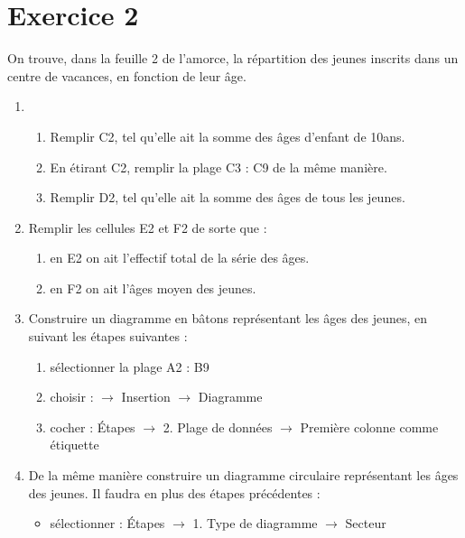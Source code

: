 \section*{Exercice 2}

On trouve,
dans la feuille 2 de l'amorce,
la répartition des jeunes inscrits dans un centre de vacances, en fonction de leur âge.

\begin{enumerate}
    \item \begin{enumerate}
        \item Remplir C2, tel qu'elle ait la somme des âges d'enfant de 10ans.
        \item En étirant C2, remplir la plage C3 : C9 de la même manière.
        \item Remplir D2, tel qu'elle ait la somme des âges de tous les jeunes.
    \end{enumerate}
    \item Remplir les cellules E2 et F2 de sorte que :
    \begin{enumerate}
        \item en E2 on ait l'effectif total de la série des âges.
        \item en F2 on ait l'âges moyen des jeunes.
    \end{enumerate}
    \item Construire un diagramme en bâtons représentant les âges des jeunes,
    en suivant les étapes suivantes :
    \begin{enumerate}
        \item sélectionner la plage A2 : B9
        \item choisir : $\rightarrow$ Insertion $\rightarrow$  Diagramme
        \item cocher : Étapes $\rightarrow$ 2. Plage de données $\rightarrow$ Première colonne comme étiquette
    \end{enumerate}
    \item De la même manière construire un diagramme circulaire représentant les âges des jeunes.
    Il faudra en plus des étapes précédentes :
    \begin{itemize}
        \item sélectionner : Étapes $\rightarrow$ 1. Type de diagramme $\rightarrow$  Secteur
    \end{itemize}    
\end{enumerate}